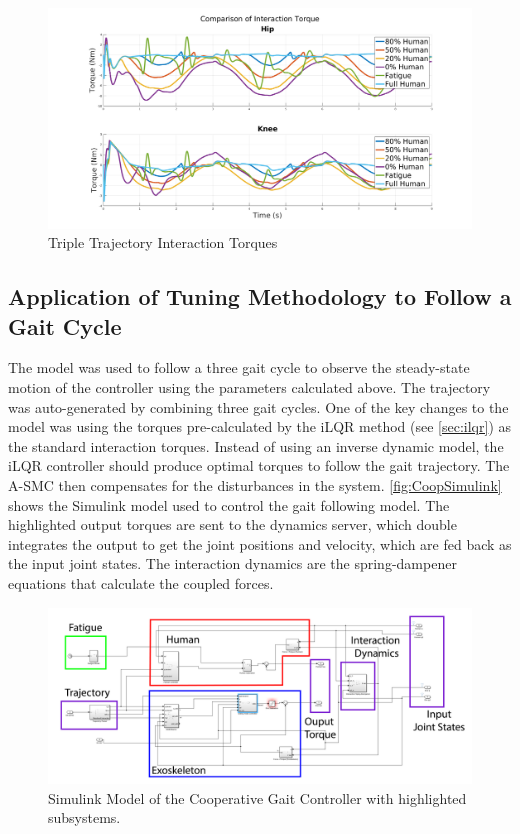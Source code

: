 \begin{figure}
    \centering
    \includegraphics[width=\columnwidth]{images/controllers/trajs/interactions.png}
    \caption[Triple Trajectory Interaction Torques]{Triple Trajectory Interaction Torques}
    \label{fig:InteractionTripleTraj}
\end{figure}


\subsection{Application of Tuning Methodology to Follow a Gait Cycle}


The model was used to follow a three gait cycle to observe the steady-state motion of the controller using the parameters calculated above. The trajectory was auto-generated by combining three gait cycles.  One of the key changes to the model was using the torques pre-calculated by the iLQR method (see \autoref{sec:ilqr}) as the standard interaction torques.  Instead of using an inverse dynamic model, the iLQR controller should produce optimal torques to follow the gait trajectory. The A-SMC then compensates for the disturbances in the system. \autoref{fig:CoopSimulink} shows the Simulink model used to control the gait following model. The highlighted output torques are sent to the dynamics server, which double integrates the output to get the joint positions and velocity, which are fed back as the input joint states. The interaction dynamics are the spring-dampener equations that calculate the coupled forces.  



\begin{figure}[h!]
    \centering
    \includegraphics[width=\columnwidth]{images/controllers/upper_model_simulink_edit.png}
    \caption[Simulink Model Cooperative Controller]{Simulink Model of the Cooperative Gait Controller with highlighted subsystems.}
    \label{fig:CoopSimulink}
\end{figure}


